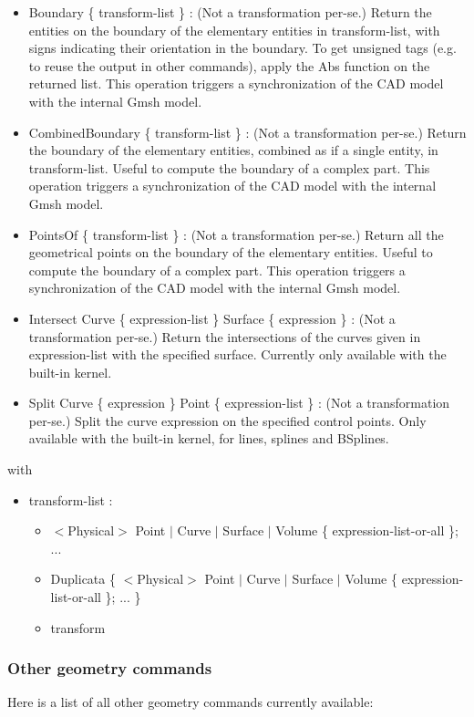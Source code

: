 \documentclass[dvipdfmx, 9pt, a4paper]{article}
\numberwithin{equation}{section}
\begin{document}
\begin{itemize}
\begin{itemize}
\item Boundary \{ transform-list \} : (Not a transformation per-se.) Return the entities on the boundary of the elementary entities in transform-list, with signs indicating their orientation in the boundary. To get unsigned tags (e.g. to reuse the output in other commands), apply the Abs function on the returned list. This operation triggers a synchronization of the CAD model with the internal Gmsh model.
\item CombinedBoundary \{ transform-list \} : (Not a transformation per-se.) Return the boundary of the elementary entities, combined as if a single entity, in transform-list. Useful to compute the boundary of a complex part. This operation triggers a synchronization of the CAD model with the internal Gmsh model.
\item PointsOf \{ transform-list \} : (Not a transformation per-se.) Return all the geometrical points on the boundary of the elementary entities. Useful to compute the boundary of a complex part. This operation triggers a synchronization of the CAD model with the internal Gmsh model.
\item Intersect Curve \{ expression-list \} Surface \{ expression \} : (Not a transformation per-se.) Return the intersections of the curves given in expression-list with the specified surface. Currently only available with the built-in kernel.
\item Split Curve \{ expression \} Point \{ expression-list \} : (Not a transformation per-se.) Split the curve expression on the specified control points. Only available with the built-in kernel, for lines, splines and BSplines.
\end{itemize}
\end{itemize}
with
\begin{itemize}
\item transform-list : 
\begin{itemize}
\item $<$Physical$>$ Point $|$ Curve $|$ Surface $|$ Volume \{ expression-list-or-all \}; ... 
\item Duplicata \{ $<$Physical$>$ Point $|$ Curve $|$ Surface $|$ Volume \{ expression-list-or-all \}; ... \}
\item transform
\end{itemize}
\end{itemize}

\subsubsection{Other geometry commands}
Here is a list of all other geometry commands currently available:
\end{document}
